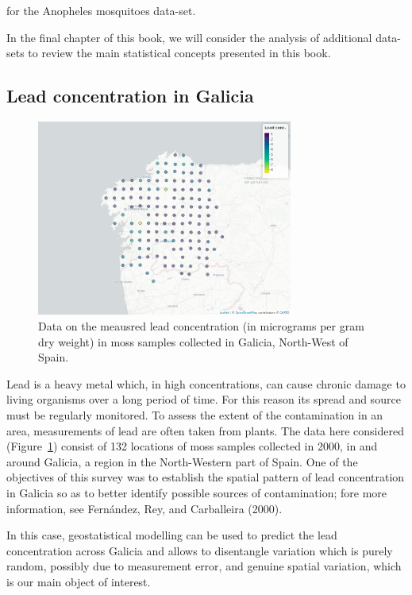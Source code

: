 \documentclass[
  letterpaper,
]{krantz}
\begin{document}
for the Anopheles mosquitoes data-set.

In the final chapter of this book, we will consider the analysis of
additional data-sets to review the main statistical concepts presented
in this book.

\hypertarget{lead-concentration-in-galicia}{%
\subsection{Lead concentration in
Galicia}\label{lead-concentration-in-galicia}}

\begin{figure}

{\centering \includegraphics[width=3.31in,height=\textheight]{./figures/galicia_ch1.png}

}

\caption{\label{fig-galicia-ch1}Data on the meausred lead concentration
(in micrograms per gram dry weight) in moss samples collected in
Galicia, North-West of Spain.}

\end{figure}

Lead is a heavy metal which, in high concentrations, can cause chronic
damage to living organisms over a long period of time. For this reason
its spread and source must be regularly monitored. To assess the extent
of the contamination in an area, measurements of lead are often taken
from plants. The data here considered (Figure~\ref{fig-galicia-ch1})
consist of 132 locations of moss samples collected in 2000, in and
around Galicia, a region in the North-Western part of Spain. One of the
objectives of this survey was to establish the spatial pattern of lead
concentration in Galicia so as to better identify possible sources of
contamination; fore more information, see Fernández, Rey, and
Carballeira (2000).

In this case, geostatistical modelling can be used to predict the lead
concentration across Galicia and allows to disentangle variation which
is purely random, possibly due to measurement error, and genuine spatial
variation, which is our main object of interest.
\end{document}
